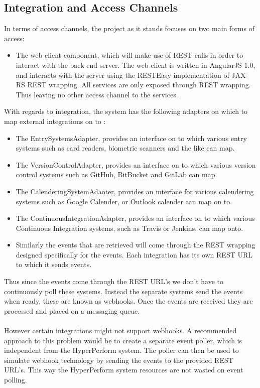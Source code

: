 \documentclass[11pt,a4paper]{article}
\begin{document}
\subsection{Integration and Access Channels}
In terms of access channels, the project as it stands focuses on two main forms of access:
\begin{itemize}
	\item The web-client component, which will make use of REST calls in order to interact with the back end server. The web client is written in AngularJS 1.0, and interacts with the server using the RESTEasy implementation of JAX-RS REST wrapping. All services are only exposed through REST wrapping. Thus leaving no other access channel to the services.
\end{itemize}
With regards to integration, the system has the following adapters on which to map external integrations on to :
\begin{itemize}
	\item The EntrySystemsAdapter, provides an interface on to which various entry systems such as card readers, biometric scanners and the like can map.
	\item The VersionControlAdapter, provides an interface on to which various version control systems such as GitHub, BitBucket and GitLab can map.
	\item The CalenderingSystemAdaoter, provides an interface for various calendering systems such as Google Calender, or Outlook calender can map on to.
	\item The ContinuousIntegrationAdapter, provides an interface on to which various Continuous Integration systems, such as Travis or Jenkins, can map onto.
	
	\item Similarly the events that are retrieved will come through the REST wrapping designed specifically for the events. Each integration has its own REST URL to which it sends events.
\end{itemize}
Thus since the events come through the REST URL's we don't have to continuously poll these systems. Instead the separate systems send the events when ready, these are known as webhooks. Once the events are received they are processed and placed on a messaging queue.\\ \\
However certain integrations might not support webhooks. A recommended approach to this problem would be to create a separate event poller, which is independent from the HyperPerform system. The poller can then be used to simulate webhook technology by sending the events to the provided REST URL's. This way the HyperPerform system resources are not wasted on event polling.
\end{document}
